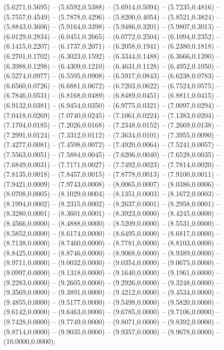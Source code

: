 (5.6271,0.5695) -- (5.6592,0.5388) -- (5.6914,0.5094) -- (5.7235,0.4816) -- (5.7557,0.4549) -- (5.7878,0.4296) -- (5.8200,0.4054) -- (5.8521,0.3824) -- (5.8843,0.3606) -- (5.9164,0.3398) -- (5.9486,0.3201) -- (5.9807,0.3013) -- (6.0129,0.2834) -- (6.0451,0.2665) -- (6.0772,0.2504) -- (6.1094,0.2352) -- (6.1415,0.2207) -- (6.1737,0.2071) -- (6.2058,0.1941) -- (6.2380,0.1818) -- (6.2701,0.1702) -- (6.3023,0.1592) -- (6.3344,0.1488) -- (6.3666,0.1390) -- (6.3988,0.1298) -- (6.4309,0.1210) -- (6.4631,0.1128) -- (6.4952,0.1050) -- (6.5274,0.0977) -- (6.5595,0.0908) -- (6.5917,0.0843) -- (6.6238,0.0783) -- (6.6560,0.0726) -- (6.6881,0.0672) -- (6.7203,0.0622) -- (6.7524,0.0575) -- (6.7846,0.0531) -- (6.8168,0.0489) -- (6.8489,0.0451) -- (6.8811,0.0415) -- (6.9132,0.0381) -- (6.9454,0.0350) -- (6.9775,0.0321) -- (7.0097,0.0294) -- (7.0418,0.0269) -- (7.0740,0.0245) -- (7.1061,0.0224) -- (7.1383,0.0204) -- (7.1704,0.0185) -- (7.2026,0.0168) -- (7.2348,0.0152) -- (7.2669,0.0138) -- (7.2991,0.0124) -- (7.3312,0.0112) -- (7.3634,0.0101) -- (7.3955,0.0090) -- (7.4277,0.0081) -- (7.4598,0.0072) -- (7.4920,0.0064) -- (7.5241,0.0057) -- (7.5563,0.0051) -- (7.5884,0.0045) -- (7.6206,0.0040) -- (7.6528,0.0035) -- (7.6849,0.0031) -- (7.7171,0.0027) -- (7.7492,0.0023) -- (7.7814,0.0020) -- (7.8135,0.0018) -- (7.8457,0.0015) -- (7.8778,0.0013) -- (7.9100,0.0011) -- (7.9421,0.0009) -- (7.9743,0.0008) -- (8.0065,0.0007) -- (8.0386,0.0006) -- (8.0708,0.0005) -- (8.1029,0.0004) -- (8.1351,0.0003) -- (8.1672,0.0003) -- (8.1994,0.0002) -- (8.2315,0.0002) -- (8.2637,0.0001) -- (8.2958,0.0001) -- (8.3280,0.0001) -- (8.3601,0.0001) -- (8.3923,0.0000) -- (8.4245,0.0000) -- (8.4566,0.0000) -- (8.4888,0.0000) -- (8.5209,0.0000) -- (8.5531,0.0000) -- (8.5852,0.0000) -- (8.6174,0.0000) -- (8.6495,0.0000) -- (8.6817,0.0000) -- (8.7138,0.0000) -- (8.7460,0.0000) -- (8.7781,0.0000) -- (8.8103,0.0000) -- (8.8425,0.0000) -- (8.8746,0.0000) -- (8.9068,0.0000) -- (8.9389,0.0000) -- (8.9711,0.0000) -- (9.0032,0.0000) -- (9.0354,0.0000) -- (9.0675,0.0000) -- (9.0997,0.0000) -- (9.1318,0.0000) -- (9.1640,0.0000) -- (9.1961,0.0000) -- (9.2283,0.0000) -- (9.2605,0.0000) -- (9.2926,0.0000) -- (9.3248,0.0000) -- (9.3569,0.0000) -- (9.3891,0.0000) -- (9.4212,0.0000) -- (9.4534,0.0000) -- (9.4855,0.0000) -- (9.5177,0.0000) -- (9.5498,0.0000) -- (9.5820,0.0000) -- (9.6142,0.0000) -- (9.6463,0.0000) -- (9.6785,0.0000) -- (9.7106,0.0000) -- (9.7428,0.0000) -- (9.7749,0.0000) -- (9.8071,0.0000) -- (9.8392,0.0000) -- (9.8714,0.0000) -- (9.9035,0.0000) -- (9.9357,0.0000) -- (9.9678,0.0000) -- (10.0000,0.0000);
